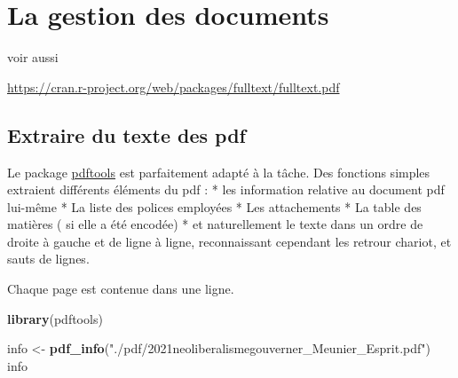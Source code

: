 \documentclass[
]{book}
\newenvironment{Shaded}{\begin{snugshade}}{\end{snugshade}}
\newcommand{\KeywordTok}[1]{\textcolor[rgb]{0.13,0.29,0.53}{\textbf{#1}}}
\newcommand{\NormalTok}[1]{#1}
\newcommand{\StringTok}[1]{\textcolor[rgb]{0.31,0.60,0.02}{#1}}
\begin{document}
\hypertarget{la-gestion-des-documents}{%
\section{La gestion des documents}\label{la-gestion-des-documents}}

voir aussi

\url{https://cran.r-project.org/web/packages/fulltext/fulltext.pdf}

\hypertarget{extraire-du-texte-des-pdf}{%
\subsection{Extraire du texte des pdf}\label{extraire-du-texte-des-pdf}}

Le package \href{https://ropensci.org/blog/2016/03/01/pdftools-and-jeroen/}{pdftools} est parfaitement adapté à la tâche. Des fonctions simples extraient différents éléments du pdf :
* les information relative au document pdf lui-même
* La liste des polices employées
* Les attachements
* La table des matières ( si elle a été encodée)
* et naturellement le texte dans un ordre de droite à gauche et de ligne à ligne, reconnaissant cependant les retrour chariot, et sauts de lignes.

Chaque page est contenue dans une ligne.

\begin{Shaded}
\begin{Highlighting}[]
\KeywordTok{library}\NormalTok{(pdftools)}

\NormalTok{info <-}\StringTok{ }\KeywordTok{pdf_info}\NormalTok{(}\StringTok{"./pdf/2021neoliberalismegouverner_Meunier_Esprit.pdf"}\NormalTok{)}
\NormalTok{info}
\end{Highlighting}
\end{Shaded}
\end{document}
